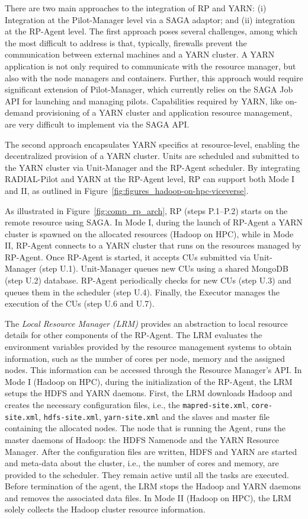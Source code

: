 There are two main approaches to the integration of RP and YARN: (i)
Integration at the Pilot-Manager level via a SAGA adaptor; and (ii) integration
at the RP-Agent level. The first approach poses several challenges,
among which the most difficult to address is that, typically, firewalls prevent
the communication between external machines and a YARN cluster. A YARN
application is not only required to communicate with the resource manager, but
also with the node managers and containers. Further, this approach would require
significant extension of Pilot-Manager, which currently relies on the SAGA Job
API for launching and managing pilots. Capabilities required by YARN, like
on-demand provisioning of a YARN cluster and application resource management,
are very difficult to implement via the SAGA API.

The second approach encapsulates YARN specifics at resource-level, enabling the
decentralized provision of a YARN cluster. Units are scheduled and submitted to
the YARN cluster via Unit-Manager and the RP-Agent scheduler. By
integrating RADIAL-Pilot and YARN at the RP-Agent level,
RP can support both Mode I and II, as outlined in
Figure~\ref{fig:figures_hadoop-on-hpc-viceverse}.

As illustrated in Figure~\ref{fig:comp_rp_arch}, RP (steps P.1--P.2)
starts on the remote resource using SAGA. In Mode I, during the launch of
RP-Agent a YARN cluster is spawned on the allocated resources (Hadoop
on HPC), while in Mode II, RP-Agent connects to a YARN cluster that
runs on the resources managed by RP-Agent. Once RP-Agent
is started, it accepts CUs submitted via Unit-Manager (step U.1).
Unit-Manager queues new CUs using a shared MongoDB (step U.2)
database. RP-Agent periodically checks for new CUs (step
U.3) and queues them in the scheduler (step U.4). Finally, the Executor manages
the execution of the CUs (step U.6 and U.7).

The \emph{Local Resource Manager (LRM)} provides an abstraction to local
resource details for other components of the RP-Agent. The LRM
evaluates the environment variables provided by the resource management systems
to obtain information, such as the number of cores per node, memory and the
assigned nodes. This information can be accessed through the Resource Manager's
API. In Mode I (Hadoop on HPC), during the initialization of the
RP-Agent, the LRM setups the HDFS and YARN daemons. First, the LRM
downloads Hadoop and creates the necessary configuration files, i.e., the
\texttt{mapred-site.xml}, \texttt{core-site.xml}, \texttt{hdfs-site.xml},
\texttt{yarn-site.xml} and the slaves and master file containing the allocated
nodes. The node that is running the Agent, runs the master daemons of Hadoop:
the HDFS Namenode and the YARN Resource Manager. After the configuration files
are written, HDFS and YARN are started and meta-data about the cluster, i.e.,
the number of cores and memory, are provided to the scheduler. They remain
active until all the tasks are executed. Before termination of the agent, the
LRM stops the Hadoop and YARN daemons and removes the associated data files. In
Mode II (Hadoop on HPC), the LRM solely collects the Hadoop cluster resource
information.

